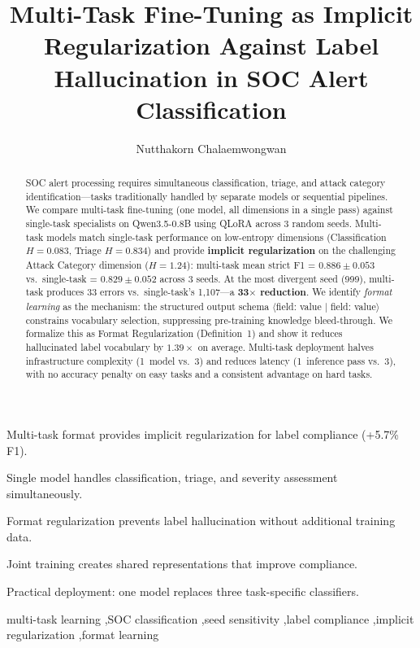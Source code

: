 \documentclass[review,3p]{elsarticle}
\begin{document}
\title{Multi-Task Fine-Tuning as Implicit Regularization Against Label Hallucination in SOC Alert Classification}
\author[kmitl]{Nutthakorn Chalaemwongwan}
\address[kmitl]{Department of Computer Engineering, KOSEN-KMITL, King Mongkut's Institute of Technology Ladkrabang, Bangkok, Thailand}
\begin{frontmatter}

\begin{highlights}
\item Multi-task format provides implicit regularization for label compliance (+5.7\% F1).
\item Single model handles classification, triage, and severity assessment simultaneously.
\item Format regularization prevents label hallucination without additional training data.
\item Joint training creates shared representations that improve compliance.
\item Practical deployment: one model replaces three task-specific classifiers.
\end{highlights}

\begin{abstract}
SOC alert processing requires simultaneous classification, triage, and attack category identification---tasks traditionally handled by separate models or sequential pipelines. We compare multi-task fine-tuning (one model, all dimensions in a single pass) against single-task specialists on Qwen3.5-0.8B using QLoRA across 3 random seeds. Multi-task models match single-task performance on low-entropy dimensions (Classification $H=0.083$, Triage $H=0.834$) and provide \textbf{implicit regularization} on the challenging Attack Category dimension ($H=1.24$): multi-task mean strict F1 = $0.886 \pm 0.053$ vs.\ single-task = $0.829 \pm 0.052$ across 3 seeds. At the most divergent seed (999), multi-task produces 33 errors vs.\ single-task's 1,107---a \textbf{33$\times$ reduction}. We identify \emph{format learning} as the mechanism: the structured output schema $\langle$field: value $|$ field: value$\rangle$ constrains vocabulary selection, suppressing pre-training knowledge bleed-through. We formalize this as Format Regularization (Definition~1) and show it reduces hallucinated label vocabulary by $1.39\times$ on average. Multi-task deployment halves infrastructure complexity (1~model vs.\ 3) and reduces latency (1~inference pass vs.\ 3), with no accuracy penalty on easy tasks and a consistent advantage on hard tasks.
\end{abstract}

\begin{keyword}
multi-task learning \sep SOC classification \sep seed sensitivity \sep label compliance \sep implicit regularization \sep format learning
\end{keyword}

\end{frontmatter}
\end{document}
